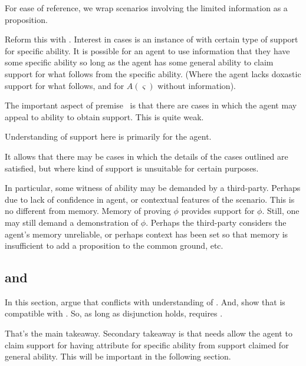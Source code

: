 \begin{note}
  For ease of reference, we wrap scenarios involving the limited information as a proposition.
  \begin{proposition}[\eA{-} --- \eA{}]\label{prem:ab}
    {
      {\color{red}
        Reform this with \aben{}.
      }
      Interest in cases is an instance of \aben{} with certain type of support for specific ability.
    }
    It is possible for an agent to use information that they have some specific ability so long as the agent has some general ability to claim support for what follows from the specific ability.
    (Where the agent lacks doxastic support for what follows, and for \(A(\varsigma)\) without information).
  \end{proposition}
\end{note}

\begin{note}
  The important aspect of premise~\eA{} is that there are cases in which the agent may appeal to ability to obtain support.
  This is quite weak.

  Understanding of support here is primarily for the agent.

  It allows that there may be cases in which the details of the cases outlined are satisfied, but where kind of support is unsuitable for certain purposes.
\end{note}

\begin{note}
  In particular, some witness of ability may be demanded by a third-party.
  Perhaps due to lack of confidence in agent, or contextual features of the scenario.
  This is no different from memory.
  Memory of proving \(\phi\) provides support for \(\phi\).
  Still, one may still demand a demonstration of \(\phi\).
  Perhaps the third-party considers the agent's memory unreliable, or perhaps context has been set so that memory is insufficient to add a proposition to the common ground, etc.
\end{note}

\subsection{\uRa{} and \WR{}}
\label{sec:first-conditional}

\begin{note}[Summary]
  In this section, argue that \uRa{} conflicts with \WR{} understanding of \aben{}.
  And, show that \AR{} is compatible with \uRa{}.
  So, as long as disjunction holds, \uRa{} requires \AR{}.

  That's the main takeaway.
  Secondary takeaway is that \gsi{} needs allow the agent to claim support for having attribute for specific ability from support claimed for general ability.
  This will be important in the following section.
\end{note}

